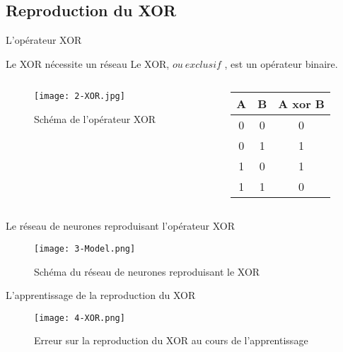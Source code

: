 \subsection{Reproduction du XOR}

\begin{frame}{L'opérateur XOR}
	\begin{block}{Le XOR nécessite un réseau}
		Le XOR, \og $ou\ exclusif$ \fg, est un opérateur binaire. \\
	\end{block}
    \begin{columns}
        \begin{column}{0.6\textwidth}
            \begin{figure}
                \centering
                \texttt{[image: 2-XOR.jpg]}
                \caption{Schéma de l'opérateur XOR}
            \end{figure}
        \end{column}
        \begin{column}[]{0.3\textwidth}
            \begin{center}
                \begin{tabular}{|c c | c|}
                    \hline
                    A & B & A xor B \\ \hline
                    0 & 0 & 0 \\
                    0 & 1 & 1 \\
                    1 & 0 & 1 \\
                    1 & 1 & 0 \\
                    \hline
                \end{tabular}
                \end{center}
        \end{column}
    \end{columns}
\end{frame}



\begin{frame}{Le réseau de neurones reproduisant l'opérateur XOR}
	\begin{figure}
		\centering
		\texttt{[image: 3-Model.png]}
		\caption{Schéma du réseau de neurones reproduisant le XOR}
	\end{figure}
\end{frame}

\begin{frame}{L'apprentissage de la reproduction du XOR}
	\begin{figure}
		\centering
		\texttt{[image: 4-XOR.png]}
		\caption{Erreur sur la reproduction du XOR au cours de l'apprentissage}
	\end{figure}
\end{frame}


